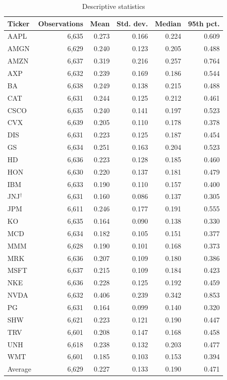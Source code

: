 \documentclass[12pt]{article}
\begin{document}
\begin{table}[!htbp]
\centering
\caption{Descriptive statistics}
\label{tab:qmlesummary}
\small
\setlength{\tabcolsep}{7pt}
\renewcommand{\arraystretch}{0.96}
\begin{tabular}{lrrrrr}
\toprule
Ticker & Observations & Mean & Std. dev. & Median & 95th pct. \\
\midrule
AAPL & 6,635 & 0.273 & 0.166 & 0.224 & 0.609 \\
AMGN & 6,629 & 0.240 & 0.123 & 0.205 & 0.488 \\
AMZN & 6,637 & 0.319 & 0.216 & 0.257 & 0.764 \\
AXP  & 6,632 & 0.239 & 0.169 & 0.186 & 0.544 \\
BA   & 6,638 & 0.249 & 0.138 & 0.215 & 0.488 \\
CAT  & 6,631 & 0.244 & 0.125 & 0.212 & 0.461 \\
CSCO & 6,635 & 0.240 & 0.141 & 0.197 & 0.523 \\
CVX  & 6,639 & 0.205 & 0.110 & 0.178 & 0.378 \\
DIS  & 6,631 & 0.223 & 0.125 & 0.187 & 0.454 \\
GS   & 6,634 & 0.251 & 0.163 & 0.204 & 0.523 \\
HD   & 6,636 & 0.223 & 0.128 & 0.185 & 0.460 \\
HON  & 6,630 & 0.220 & 0.137 & 0.181 & 0.479 \\
IBM  & 6,633 & 0.190 & 0.110 & 0.157 & 0.400 \\
JNJ$^{\dagger}$ & 6,631 & 0.160 & 0.086 & 0.137 & 0.305 \\
JPM  & 6,611 & 0.246 & 0.177 & 0.191 & 0.555 \\
KO   & 6,635 & 0.164 & 0.090 & 0.138 & 0.330 \\
MCD  & 6,634 & 0.182 & 0.105 & 0.151 & 0.377 \\
MMM  & 6,628 & 0.190 & 0.101 & 0.168 & 0.373 \\
MRK  & 6,636 & 0.207 & 0.109 & 0.180 & 0.386 \\
MSFT & 6,637 & 0.215 & 0.109 & 0.184 & 0.423 \\
NKE  & 6,636 & 0.228 & 0.125 & 0.192 & 0.459 \\
NVDA & 6,632 & 0.406 & 0.239 & 0.342 & 0.853 \\
PG   & 6,631 & 0.164 & 0.099 & 0.140 & 0.320 \\
SHW  & 6,621 & 0.223 & 0.121 & 0.190 & 0.447 \\
TRV  & 6,601 & 0.208 & 0.147 & 0.168 & 0.458 \\
UNH  & 6,618 & 0.238 & 0.132 & 0.203 & 0.477 \\
WMT  & 6,601 & 0.185 & 0.103 & 0.153 & 0.394 \\
\midrule
Average & 6,629 & 0.227 & 0.133 & 0.190 & 0.471 \\
\bottomrule
\end{tabular}


\end{table}
\end{document}
